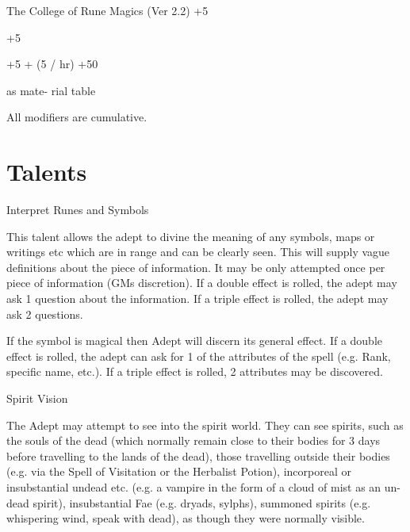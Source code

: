 \begin{Chapter}{The College of Rune Magics (Ver 2.2)}
+5 

+5 

+5  + (5 / 
hr) 
+50 

as mate-
rial table 

All modifiers are cumulative. 

\section{Talents}

\begin{talent}[T-1]{Interpret Runes and Symbols }

\begin{effects}
 This  talent  allows  the  adept  to  divine  the 
meaning  of  any  symbols,  maps  or  writings  etc 
which  are  in  range  and  can  be  clearly  seen.  This 
will  supply  vague  definitions  about  the  piece  of 
information.  It  may  be  only  attempted  once  per 
piece of information (GMs discretion).  If a double 
effect is rolled, the adept may ask 1 question about 
the information. If a triple effect is rolled, the adept 
may ask 2 questions. 

If the symbol is magical then Adept will discern its 
general effect. If a double effect is rolled, the adept 
can  ask  for  1  of  the  attributes  of  the  spell  (e.g. 
Rank,  specific  name,  etc.).  If  a  triple  effect  is 
rolled, 2 attributes may be discovered. 

\end{effects}
\end{talent}

\begin{talent}[T-2]{Spirit Vision }

\begin{effects}
 The  Adept  may  attempt  to  see  into  the 
spirit world. They can see spirits, such as the souls 
of  the  dead  (which  normally  remain  close  to  their 
bodies  for  3  days  before  travelling  to  the  lands  of 
the dead), those travelling outside their bodies (e.g. 
via the Spell of Visitation or the Herbalist Potion), 
incorporeal  or  insubstantial  undead  etc.  (e.g.  a 
vampire  in  the  form  of  a  cloud  of  mist  as  an  un-
dead spirit), insubstantial Fae (e.g. dryads, sylphs), 
summoned  spirits  (e.g.  whispering  wind,  speak 
with dead), as though they were normally visible. 


\end{effects}
\end{talent}
\end{Chapter}
